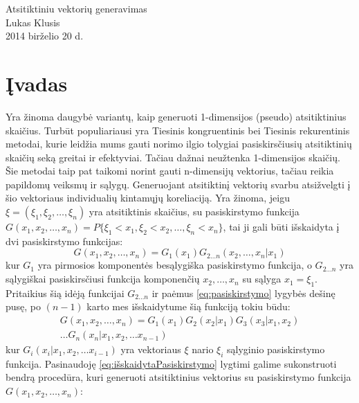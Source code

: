 \documentclass[12pt]{article}
\begin{document}
\begin{center}
{\large Atsitiktiniu vektorių generavimas} \\ %
Lukas Klusis \\
2014 birželio 20 d.
\end{center}

\section{Įvadas}
Yra žinoma daugybė variantų, kaip generuoti 1-dimensijos (pseudo) atsitiktinius skaičius. Turbūt populiariausi yra Tiesinis kongruentinis bei Tiesinis rekurentinis metodai, kurie leidžia mums gauti norimo ilgio tolygiai pasiskirsčiusių atsitiktinių skaičių seką greitai ir efektyviai. Tačiau dažnai neužtenka 1-dimensijos skaičių. Šie metodai taip pat taikomi norint gauti n-dimensijų vektorius, tačiau reikia papildomų veiksmų ir sąlygų. Generuojant atsitiktinį vektorių svarbu atsižvelgti į šio vektoriaus individualių kintamųjų koreliaciją. 
Yra žinoma, jeigu $\xi= (\xi_1, \xi_2, \ldots, \xi_n)$ yra atsitiktinis skaičius, su pasiskirstymo funkcija $G(x_1, x_2, \ldots, x_n) = P\{\xi_1<x_1, \xi_2<x_2, \ldots, \xi_n<x_n\}$, tai ji gali būti išskaidyta į dvi pasiskirstymo funkcijas:
\begin{equation}
\label{eq:pasiskirstymo}
G(x_1, x_2, \ldots, x_n) = G_1(x_1)G_{2\ldots n}(x_2, \ldots, x_n| x_1)
\end{equation}
kur $G_1$ yra pirmosios komponentės besąlygiška pasiskirstymo funkcija, o $G_{2 \ldots n}$ yra sąlygiškai pasiskirsčiusi funkcija komponenčių $x_2, \ldots, x_n$ su sąlyga $x_1 = \xi_1$. Pritaikius šią idėją funkcijai $G_{2 \ldots n}$ ir paėmus \eqref{eq:pasiskirstymo} lygybės dešinę pusę, po $(n-1)$ karto mes išskaidytume šią funkciją tokiu būdu:
\begin{equation}
\begin{split}
\label{eq:išskaidytaPasiskirstymo}
G(x_1, x_2, \ldots, x_n) = G_1(x_1)G_2(x_2| x_1)G_3(x_3| x_1, x_2) \\
\ldots G_n(x_n| x_1, x_2, \ldots x_{n-1})
\end{split}
\end{equation}
kur $G_i(x_i| x_1, x_2, \ldots x_{i-1})$ yra vektoriaus $\xi$ nario $\xi_i$ sąlyginio pasiskirstymo funkcija. Pasinaudoję \eqref{eq:išskaidytaPasiskirstymo} lygtimi galime sukonstruoti bendrą procedūra, kuri generuoti atsitiktinius vektorius su pasiskirstymo funkcija $G(x_1, x_2, \ldots, x_n)$:\\
\end{document}
